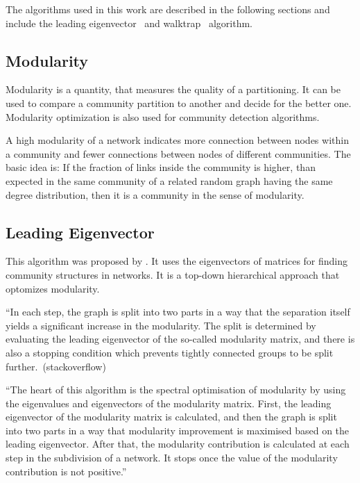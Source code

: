 The algorithms used in this work are described in the following sections and include the leading eigenvector~\cite{newman2006finding} and walktrap~\cite{pons2005computing} algorithm.

\subsection{Modularity}
Modularity is a quantity, that measures the quality of a partitioning. It can be used to compare a community partition to another and decide for the better one. Modularity optimization is also used for community detection algorithms.

A high modularity of a network indicates more connection between nodes within a community and fewer connections between nodes of different communities. The basic idea is: If the fraction of links inside the community is higher, than expected in the same community of a related random graph having the same degree distribution, then it is a community in the sense of modularity.


\subsection{Leading Eigenvector}
This algorithm was proposed by \textcite{newman2006finding}. It uses the eigenvectors of matrices for finding community structures in networks. It is a top-down hierarchical approach that optomizes modularity.

``In each step, the graph is split into two parts in a way that the separation itself yields a significant increase in the modularity. The split is determined by evaluating the leading eigenvector of the so-called modularity matrix, and there is also a stopping condition which prevents tightly connected groups to be split further.~(stackoverflow)

``The heart of this algorithm is the spectral optimisation of modularity by using the eigenvalues and eigenvectors of the modularity matrix. First, the leading eigenvector of the modularity matrix is calculated, and then the graph is split into two parts in a way that modularity improvement is maximised based on the leading eigenvector. After that, the modularity contribution is calculated at each step in the subdivision of a network. It stops once the value of the modularity contribution is not positive.''~\cite{yang2016comparative}


